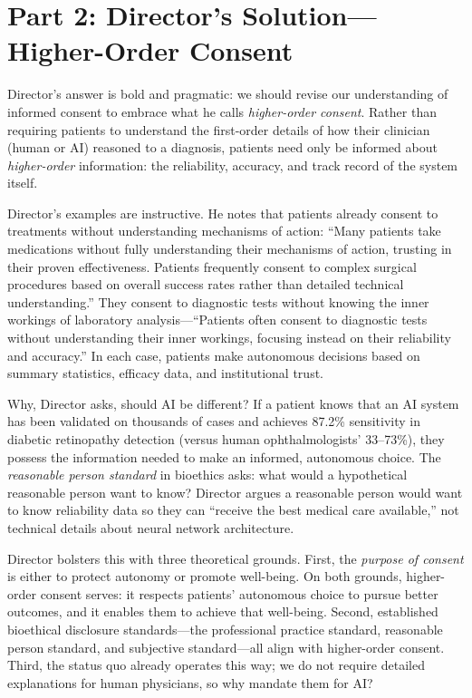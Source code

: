 \documentclass[12pt,twoside]{article}
\begin{document}
\section*{Part 2: Director's Solution---Higher-Order Consent}

Director's answer is bold and pragmatic: we should revise our understanding of informed consent to embrace what he calls \textit{higher-order consent}. Rather than requiring patients to understand the first-order details of how their clinician (human or AI) reasoned to a diagnosis, patients need only be informed about \textit{higher-order} information: the reliability, accuracy, and track record of the system itself.

Director's examples are instructive. He notes that patients already consent to treatments without understanding mechanisms of action: ``Many patients take medications without fully understanding their mechanisms of action, trusting in their proven effectiveness. Patients frequently consent to complex surgical procedures based on overall success rates rather than detailed technical understanding.'' They consent to diagnostic tests without knowing the inner workings of laboratory analysis---``Patients often consent to diagnostic tests without understanding their inner workings, focusing instead on their reliability and accuracy.'' In each case, patients make autonomous decisions based on summary statistics, efficacy data, and institutional trust.

Why, Director asks, should AI be different? If a patient knows that an AI system has been validated on thousands of cases and achieves 87.2\% sensitivity in diabetic retinopathy detection (versus human ophthalmologists' 33--73\%), they possess the information needed to make an informed, autonomous choice. The \textit{reasonable person standard} in bioethics asks: what would a hypothetical reasonable person want to know? Director argues a reasonable person would want to know reliability data so they can ``receive the best medical care available,'' not technical details about neural network architecture.

Director bolsters this with three theoretical grounds. First, the \textit{purpose of consent} is either to protect autonomy or promote well-being. On both grounds, higher-order consent serves: it respects patients' autonomous choice to pursue better outcomes, and it enables them to achieve that well-being. Second, established bioethical disclosure standards---the professional practice standard, reasonable person standard, and subjective standard---all align with higher-order consent. Third, the status quo already operates this way; we do not require detailed explanations for human physicians, so why mandate them for AI?
\end{document}
